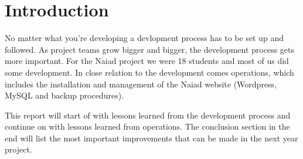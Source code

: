 \section{Introduction}\label{sec:introduction}
No matter what you're developing a devlopment process has to be set up and followed.
As project teams grow bigger and bigger, the development
process gets more important. For the Naiad project we were 18 students and most
of us did some development. In close relation to the development comes
operations, which includes the installation and management of the Naiad
website (Wordpress, MySQL and backup procedures).

This report will start of with lessons learned from the development
process and continue on with lessons learned from operations. The conclusion
section in the end will list the most important improvements that can be made
in the next year project.
